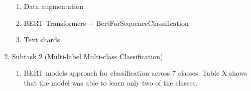 \documentclass[11pt]{article}
\begin{document}
\begin{enumerate}
\begin{enumerate}
		      \item Data augmentation


		      \item BERT Transformers + BertForSequenceClassification


		      \item Text shards

	      \end{enumerate}

	\item Subtask 2 (Multi-label Multi-class Classification)

	      \begin{enumerate}
		      \item BERT models approach for classification across 7 classes.
                    Table X shows that the model was able to learn only two of the classes.


\end{enumerate}
\end{enumerate}
\end{document}
